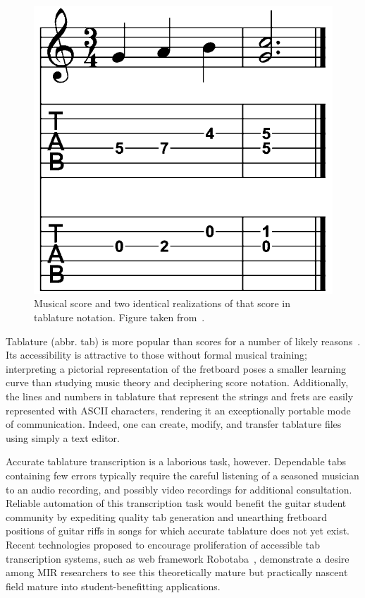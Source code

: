 \documentclass[12pt]{cmuthesis}
\begin{document}
\begin{figure}[!htbp] 
\centering
\includegraphics[scale=0.25]{score-tabs}
\caption{Musical score and two identical realizations of that score in tablature notation. Figure taken from~\cite{barbanchoi2012}.}
\label{fig:score-tabs}
\end{figure}

Tablature (abbr. tab) is more popular than scores for a number of likely reasons~\cite{macrae2010}. Its accessibility is attractive to those without formal musical training; interpreting a pictorial representation of the fretboard poses a smaller learning curve than studying music theory and deciphering score notation. Additionally, the lines and numbers in tablature that represent the strings and frets are easily represented with ASCII characters, rendering it an exceptionally portable mode of communication. Indeed, one can create, modify, and transfer tablature files using simply a text editor.

Accurate tablature transcription is a laborious task, however. Dependable tabs containing few errors typically require the careful listening of a seasoned musician to an audio recording, and possibly video recordings for additional consultation. Reliable automation of this transcription task would benefit the guitar student community by expediting quality tab generation and unearthing fretboard positions of guitar riffs in songs for which accurate tablature does not yet exist. Recent technologies proposed to encourage proliferation of accessible tab transcription systems, such as web framework Robotaba~\cite{burlet2013}, demonstrate a desire among MIR researchers to see this theoretically mature but practically nascent field mature into student-benefitting applications. 
\end{document}
